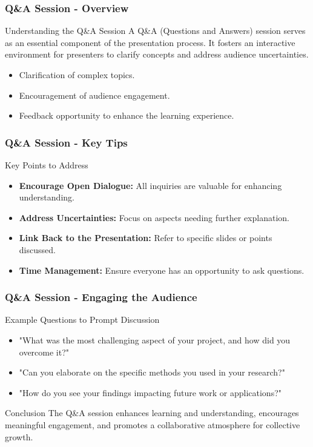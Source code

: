 \documentclass[aspectratio=169]{beamer}
\begin{document}
\begin{frame}[fragile]
    \frametitle{Q\&A Session - Overview}
    \begin{block}{Understanding the Q\&A Session}
        A Q\&A (Questions and Answers) session serves as an essential component of the presentation process. It fosters an interactive environment for presenters to clarify concepts and address audience uncertainties.
    \end{block}
    \begin{itemize}
        \item Clarification of complex topics.
        \item Encouragement of audience engagement.
        \item Feedback opportunity to enhance the learning experience.
    \end{itemize}
\end{frame}

\begin{frame}[fragile]
    \frametitle{Q\&A Session - Key Tips}
    \begin{block}{Key Points to Address}
        \begin{itemize}
            \item \textbf{Encourage Open Dialogue:} All inquiries are valuable for enhancing understanding.
            \item \textbf{Address Uncertainties:} Focus on aspects needing further explanation.
            \item \textbf{Link Back to the Presentation:} Refer to specific slides or points discussed.
            \item \textbf{Time Management:} Ensure everyone has an opportunity to ask questions.
        \end{itemize}
    \end{block}
\end{frame}

\begin{frame}[fragile]
    \frametitle{Q\&A Session - Engaging the Audience}
    \begin{block}{Example Questions to Prompt Discussion}
        \begin{itemize}
            \item "What was the most challenging aspect of your project, and how did you overcome it?"
            \item "Can you elaborate on the specific methods you used in your research?"
            \item "How do you see your findings impacting future work or applications?"
        \end{itemize}
    \end{block}
    \begin{block}{Conclusion}
        The Q\&A session enhances learning and understanding, encourages meaningful engagement, and promotes a collaborative atmosphere for collective growth.
    \end{block}
\end{frame}
\end{document}
